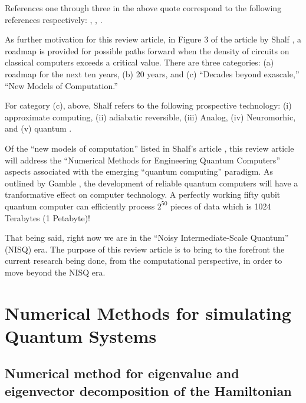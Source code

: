 \documentclass[a4paper,fleqn]{cas-sc}
\begin{document}
References one through three in the above quote 
correspond to the following references respectively: 
\cite{moore2021cramming}, \cite{mack2015multiple}, \cite{markov2014limits}.
\par\noindent
As further motivation for this review article,
in Figure 3 of the article by Shalf \cite{shalf2020future}, a 
roadmap is provided for possible paths forward when the 
density of circuits on classical computers exceeds a critical 
value.  There are three categories: 
(a) roadmap for the next ten years, 
(b) 20 years, and 
(c) ``Decades beyond exascale,'' ``New Models of Computation.'' 
\par\noindent
For category (c), above, Shalf  \cite{shalf2020future} refers to the following
prospective technology: (i) approximate computing, (ii) adiabatic reversible, (iii) Analog, (iv) Neuromorhic, and (v) 
quantum \cite{richard1982feynman,richard1986feynman}.
\par\noindent
Of the ``new models of computation'' listed in 
Shalf's article \cite{shalf2020future}, this review article will 
address the ``Numerical Methods for Engineering Quantum Computers'' 
aspects associated with the emerging ``quantum computing'' paradigm. 
As outlined by Gamble \cite{gamble2019quantum}, the development of 
reliable quantum computers will have a tranformative effect on 
computer technology. A perfectly working fifty qubit quantum computer 
can efficiently process $2^{50}$ pieces of data which is 1024 
Terabytes (1 Petabyte)!

\par\noindent
That being said, right now we are in the 
``Noisy Intermediate-Scale Quantum'' \cite{callison2022hybrid} (NISQ) era.  The purpose of this review article is to bring to the forefront the current research being done, from the 
computational perspective, in order to move beyond the NISQ era.

\section{Numerical Methods for simulating Quantum Systems}

\subsection{Numerical method for eigenvalue and eigenvector 
decomposition of the Hamiltonian}
\end{document}
